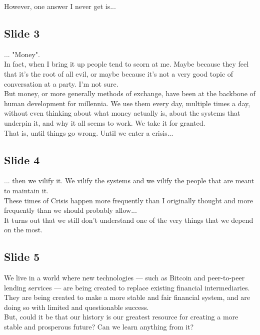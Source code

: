 \documentclass[a4paper, 11pt]{article} %
\begin{document}
However, one answer I never get is...


\subsection*{Slide 3}

... "Money".\\

In fact, when I bring it up people tend to scorn at me. Maybe because they feel that it's the root of all evil, or maybe because it's not a very good topic of conversation at a party. I'm not sure.\\

But money, or more generally methods of exchange, have been at the backbone of human development for millennia. We use them every day, multiple times a day, without even thinking about what money actually is, about the systems that underpin it, and why it all seems to work. We take it for granted.\\

That is, until things go wrong. Until we enter a crisis...


\subsection*{Slide 4}

... then we vilify it. We vilify the systems and we vilify the people that are meant to maintain it.\\

These times of Crisis happen more frequently than I originally thought and more frequently than we should probably allow...\\

It turns out that we still don't understand one of the very things that we depend on the most.


\subsection*{Slide 5}

We live in a world where new technologies --- such as Bitcoin and peer-to-peer lending services --- are being created to replace existing financial intermediaries.\\

They are being created to make a more stable and fair financial system, and are doing so with limited and questionable success.\\

But, could it be that our history is our greatest resource for creating a more stable and prosperous future? Can we learn anything from it?\\
\end{document}
